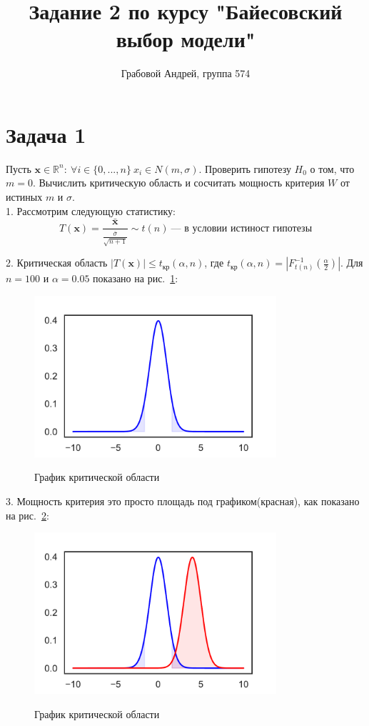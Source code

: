 \documentclass[12pt, twoside]{article}
\begin{document}
 

\title{Задание 2 по курсу "Байесовский выбор модели"}
\author{Грабовой Андрей, группа 574}
\date{}
\maketitle

\section{Задача 1}
Пусть $\textbf{x} \in \mathbb{R}^n:~\forall i\in\{0,...,n\}~x_i\in N(m,\sigma)$. Проверить гипотезу $H_0$  о том, что $m=0$. Вычислить критическую область и сосчитать мощность критерия $W$ от истиных $m$ и $\sigma$.\\

1. Рассмотрим следующую статистику:
$$T(\textbf{x}) = \frac{\bar{\textbf{x}}}{\frac{\bar{\sigma}}{\sqrt{n+1}}} \sim t(n)~\text{--- в условии истиност гипотезы}$$

2. Критическая область $|T(\textbf{x})| \le t_{\text{кр}}(\alpha, n)$, где $t_{\text{кр}}(\alpha, n) = |F_{t(n)}^{-1}(\frac{\alpha}{2})|$. Для $n = 100$ и $\alpha = 0.05$ показано на рис.~\ref{first}:

\begin{figure}[h!]\center
{\includegraphics[width=0.8\textwidth]{first}}
\caption{График критической области}
\label{first}
\end{figure}

3. Мощность критерия это просто площадь под графиком(красная), как показано на рис.~\ref{first_pow}:
\begin{figure}[h!]\center
{\includegraphics[width=0.8\textwidth]{first_pow}}
\caption{График критической области}
\label{first_pow}
\end{figure}
\end{document}
